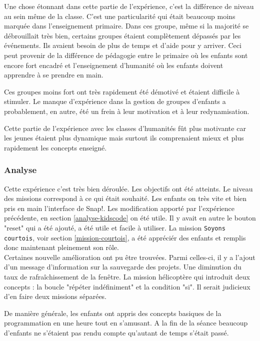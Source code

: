 Une chose étonnant dans cette partie de l'expérience, c'est la différence de niveau au sein même de la classe. C'est une particularité qui était beaucoup moins marquée dans l'enseignement primaire. Dans ces groupe, même si la majorité se débrouillait très bien, certains groupes étaient complètement dépassés par les événements. Ils avaient besoin de plus de temps et d'aide pour y arriver. Ceci peut provenir de la différence de pédagogie entre le primaire où les enfants sont encore fort encadré et l'enseignement d'humanité où les enfants doivent apprendre à se prendre en main.

Ces groupes moins fort ont très rapidement été démotivé et étaient difficile à stimuler. Le manque d'expérience dans la gestion de groupes d'enfants a probablement, en autre, été un frein à leur motivation et à leur redynamisation.

Cette partie de l'expérience avec les classes d'humanités fût plus motivante car les jeunes étaient plus dynamique mais surtout ils comprenaient mieux et plus rapidement les concepts enseigné.

\subsubsection{Analyse}
\label{analyse-scienceinfuse}
Cette expérience c'est très bien déroulée. Les objectifs ont été atteints. Le niveau des missions correspond à ce qui était souhaité. Les enfants on très vite et bien pris en main l'interface de Snap!. Les modification apporté par l'expérience précédente, en section \ref{analyse-kidscode} on été utile. Il y avait en autre le bouton "reset" qui a été ajouté, a été utile et facile à utiliser. La mission \texttt{Soyons courtois}, voir section \ref{mission-courtois}, a été appréciér des enfants et remplis donc maintenant pleinement son rôle.\\ %

Certaines nouvelle amélioration ont pu être trouvées. Parmi celles-ci, il y a l'ajout d'un message d'information sur la sauvegarde des projets. Une diminution du taux de rafraîchissement de la fenêtre. La mission hélicoptère qui introduit deux concepts : la boucle "répéter indéfiniment" et la condition "si". Il serait judicieux d'en faire deux missions séparées.

De manière générale, les enfants ont appris des concepts basiques de la programmation en une heure tout en s'amusant. A la fin de la séance beaucoup d'enfants ne s'étaient pas rendu compte qu'autant de temps s'était passé.
